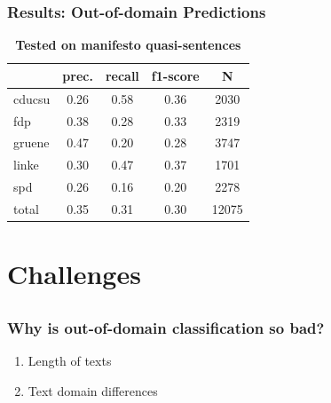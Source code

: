 \documentclass[]{beamer}
\begin{document}
\begin{frame}\frametitle{Results: Out-of-domain Predictions}

\begin{table}[t]
\caption{
\label{tab:results_out-of-domain}
{\bf Tested on manifesto quasi-sentences}}
\begin{center}
\begin{tabular}{lcccc}
    &         prec.    &recall &  f1-score  & N  \\
\hline \hline
    cducsu    &   0.26   &   0.58   &   0.36    &   2030 \\
    fdp    &   0.38   &   0.28   &   0.33    &   2319 \\
     gruene   &    0.47    &  0.20   &   0.28    &  3747\\
      linke     &  0.30  &    0.47    &  0.37    &   1701\\
        spd     &  0.26  &    0.16   &   0.20    &   2278\\
\hline
total    &   0.35  &    0.31  &    0.30   &   12075\\
%
\end{tabular}
\end{center}

\end{table}

\end{frame}

\section{Challenges}
\subsection{}

\begin{frame}\frametitle{Why is out-of-domain classification so bad?}
\begin{enumerate}
\item Length of texts
\vspace{2em}
\item Text domain differences
\end{enumerate}
\end{frame}
\end{document}
